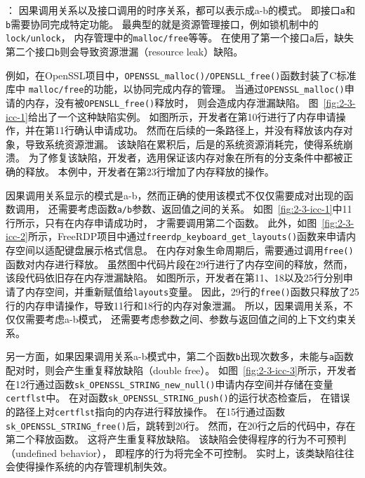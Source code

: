 \vspace*{10pt}
：
因果调用关系以及接口调用的时序关系，都可以表示成a-b的模式。
即接口\texttt{a}和\texttt{b}需要协同完成特定功能。
最典型的就是资源管理接口，例如锁机制中的\texttt{lock/unlock}，
内存管理中的\texttt{malloc/free}等等。
在使用了第一个接口\texttt{a}后，缺失第二个接口\texttt{b}则会导致资源泄漏（resource leak）缺陷。



例如，在OpenSSL项目中，\texttt{OPENSSL\_malloc()/OPENSLL\_free()}函数封装了C标准库中
\texttt{malloc/free}的功能，以协同完成内存的管理。
当通过\texttt{OPENSSL\_malloc()}申请的内存，没有被\texttt{OPENSLL\_free()}释放时，
则会造成内存泄漏缺陷。
图~\ref{fig:2-3-icc-1}给出了一个这种缺陷实例。
如图所示，开发者在第10行进行了内存申请操作，并在第11行确认申请成功。
然而在后续的一条路径上，并没有释放该内存对象，导致系统资源泄漏。
该缺陷在累积后，后是的系统资源消耗完，使得系统崩溃。
为了修复该缺陷，开发者，选用保证该内存对象在所有的分支条件中都被正确的释放。
本例中，开发者在第23行增加了内存释放的操作。



因果调用关系显示的模式是a-b，然而正确的使用该模式不仅仅需要成对出现的函数调用，
还需要考虑函数\texttt{a/b}参数、返回值之间的关系。
如图~\ref{fig:2-3-icc-1}中11行所示，只有在内存申请成功时，
才需要调用第二个函数。
此外，如图~\ref{fig:2-3-icc-2}所示，FreeRDP项目中通过\texttt{freerdp\_keyboard\_get\_layouts()}函数来申请内存空间以适配键盘展示格式信息。
在内存对象生命周期后，需要通过调用\texttt{free()}函数对内存进行释放。
虽然图中代码片段在29行进行了内存空间的释放，然而，该段代码依旧存在内存泄漏缺陷。
如图所示，开发者在第11、18以及25行分别申请了内存空间，并重新赋值给\texttt{layouts}变量。
因此，29行的\texttt{free()}函数只释放了25行的内存申请操作，导致11行和18行的内存对象泄漏。
所以，因果调用关系，不仅仅需要考虑a-b模式，
还需要考虑参数之间、参数与返回值之间的上下文约束关系。

另一方面，如果因果调用关系a-b模式中，第二个函数\texttt{b}出现次数多，未能与\texttt{a}函数配对时，则会产生重复释放缺陷（double free）。
如图~\ref{fig:2-3-icc-3}所示，开发者在12行通过函数\texttt{sk\_OPENSSL\_STRING\_new\_null()}申请内存空间并存储在变量\texttt{certflst}中。
在对函数\texttt{sk\_OPENSSL\_STRING\_push()}的运行状态检查后，
在错误的路径上对\texttt{certflst}指向的内存进行释放操作。
在15行通过函数\texttt{sk\_OPENSSL\_STRING\_free()}后，跳转到20行。
然而，在20行之后的代码中，存在第二个释放函数。
这将产生重复释放缺陷。
该缺陷会使得程序的行为不可预判（undefined behavior），
即程序的行为将完全不可控制。
实时上，该类缺陷往往会使得操作系统的内存管理机制失效。

